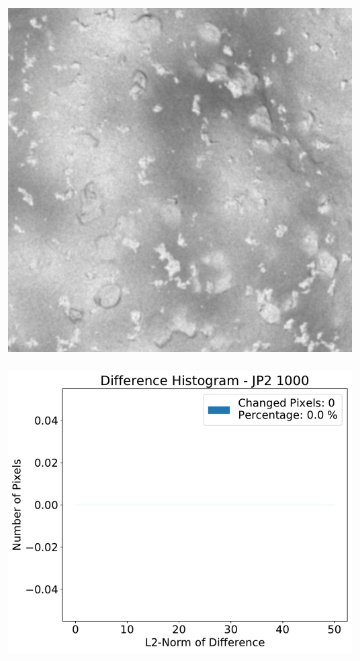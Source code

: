 \begin{figure}[htb]
    \centering
    \begin{subfigure}[b]{0.48\textwidth}
        \centering
        \includegraphics[width=\textwidth]{doc/thesis/0_figures/compare_quality/set1/jp2_1000_center}
        \caption{}
        \label{fig:img_quality_comp_jp2_1000_center_orig}
    \end{subfigure}
    \begin{subfigure}[b]{0.48\textwidth}
        \centering
        \includegraphics[width=\textwidth]{doc/thesis/0_figures/compare_quality/set1/jp2_1000_center_diff_histogram}

\end{subfigure}
\end{figure}
